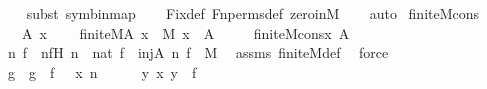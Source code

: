 \begin{isabellebody}
\ \ \ \isamarkupfalse%
{\isacharparenleft}{\kern0pt}subst\ sym{\isacharunderscore}{\kern0pt}binmap{\isacharprime}{\kern0pt}{\isacharparenright}{\kern0pt}\isanewline
\ \ \isamarkupfalse%
\ Fix{\isacharunderscore}{\kern0pt}def\ Fn{\isacharunderscore}{\kern0pt}perms{\isacharunderscore}{\kern0pt}def\ zero{\isacharunderscore}{\kern0pt}in{\isacharunderscore}{\kern0pt}M\isanewline
\ \ \isamarkupfalse%
\ auto%
\endisatagproof
{\isafoldproof}%
%
\isadelimproof
\isanewline
%
\endisadelimproof
\isanewline
{}\isamarkupfalse%
\ finite{\isacharunderscore}{\kern0pt}M{\isacharunderscore}{\kern0pt}cons\ {\isacharcolon}{\kern0pt}\ \isanewline
\ \ \ A\ x\ \isanewline
\ \ \ {\isachardoublequoteopen}finite{\isacharunderscore}{\kern0pt}M{\isacharparenleft}{\kern0pt}A{\isacharparenright}{\kern0pt}{\isachardoublequoteclose}\ {\isachardoublequoteopen}x\ {\isasymin}\ M{\isachardoublequoteclose}\ {\isachardoublequoteopen}x\ {\isasymnotin}\ A{\isachardoublequoteclose}\ \ \isanewline
\ \ \ {\isachardoublequoteopen}finite{\isacharunderscore}{\kern0pt}M{\isacharparenleft}{\kern0pt}cons{\isacharparenleft}{\kern0pt}x{\isacharcomma}{\kern0pt}\ A{\isacharparenright}{\kern0pt}{\isacharparenright}{\kern0pt}{\isachardoublequoteclose}\ \isanewline
%
\isadelimproof
%
\endisadelimproof
%
\isatagproof
{}\isamarkupfalse%
\ {\isacharminus}{\kern0pt}\ \isanewline
\isanewline
\ \ \isamarkupfalse%
\ n\ f\ \ nfH{\isacharcolon}{\kern0pt}\ {\isachardoublequoteopen}n\ {\isasymin}\ nat{\isachardoublequoteclose}\ {\isachardoublequoteopen}f\ {\isasymin}\ inj{\isacharparenleft}{\kern0pt}A{\isacharcomma}{\kern0pt}\ n{\isacharparenright}{\kern0pt}{\isachardoublequoteclose}\ {\isachardoublequoteopen}f\ {\isasymin}\ M{\isachardoublequoteclose}\ \isamarkupfalse%
\ assms\ finite{\isacharunderscore}{\kern0pt}M{\isacharunderscore}{\kern0pt}def\ \isamarkupfalse%
\ force\isanewline
\isanewline
\ \ \isamarkupfalse%
\ g\ \ {\isachardoublequoteopen}g\ {\isasymequiv}\ f\ {\isasymunion}\ {\isacharbraceleft}{\kern0pt}\ {\isacharless}{\kern0pt}x{\isacharcomma}{\kern0pt}\ n{\isachargreater}{\kern0pt}\ {\isacharbraceright}{\kern0pt}{\isachardoublequoteclose}\ \isanewline
\isanewline
\ \ \isamarkupfalse%
\ {\isachardoublequoteopen}{\isasymAnd}y{\isachardot}{\kern0pt}\ {\isacharless}{\kern0pt}x{\isacharcomma}{\kern0pt}\ y{\isachargreater}{\kern0pt}\ {\isasymnotin}\ f{\isachardoublequoteclose}\ \isanewline

\end{isabellebody}
